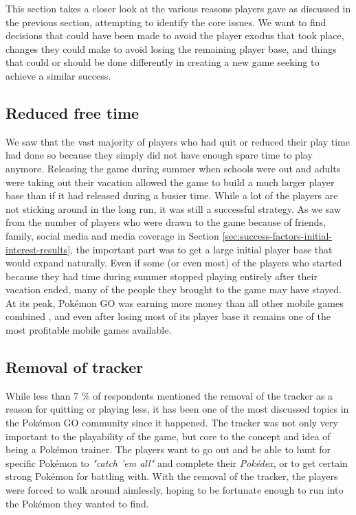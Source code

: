 This section takes a closer look at the various reasons players gave as discussed in the previous section, attempting to identify the core issues. We want to find decisions that could have been made to avoid the player exodus that took place, changes they could make to avoid losing the remaining player base, and things that could or should be done differently in creating a new game seeking to achieve a similar success.

\subsection{Reduced free time}
\label{sec:reduced-free-time}
We saw that the vast majority of players who had quit or reduced their play time had done so because they simply did not have enough spare time to play anymore. Releasing the game during summer when schools were out and adults were taking out their vacation allowed the game to build a much larger player base than if it had released during a busier time. While a lot of the players are not sticking around in the long run, it was still a successful strategy. As we saw from the number of players who were drawn to the game because of friends, family, social media and media coverage in Section \ref{sec:success-factors-initial-interest-results}, the important part was to get a large initial player base that would expand naturally. Even if some (or even most) of the players who started because they had time during summer stopped playing entirely after their vacation ended, many of the people they brought to the game may have stayed. At its peak, Pokémon GO was earning more money than all other mobile games combined \cite{forbesPogoMoney}, and even after losing most of its player base it remains one of the most profitable mobile games available.

\subsection{Removal of tracker}
While less than 7 \% of respondents mentioned the removal of the tracker as a reason for quitting or playing less, it has been one of the most discussed topics in the Pokémon GO community since it happened. The tracker was not only very important to the playability of the game, but core to the concept and idea of being a Pokémon trainer. The players want to go out and be able to hunt for specific Pokémon to \emph{"catch 'em all"} and complete their \emph{Pokédex}, or to get certain strong Pokémon for battling with. With the removal of the tracker, the players were forced to walk around aimlessly, hoping to be fortunate enough to run into the Pokémon they wanted to find.

